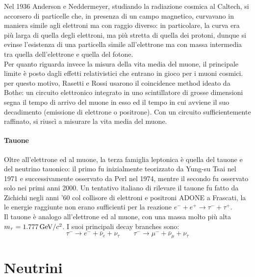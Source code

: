 Nel 1936 Anderson e Neddermeyer, studiando la radiazione cosmica al Caltech, si accorsero di particelle che, in presenza di un campo magnetico, curvavano in maniera simile agli elettroni ma con raggio diverso: in particolare, la curva era più larga di quella degli elettroni, ma più stretta di quella dei protoni, dunque si evinse l'esistenza di una particella simile all'elettrone ma con massa intermedia tra quella dell'elettrone e quella del fotone.\\
Per quanto riguarda invece la misura della vita media del muone, il principale limite è posto dagli effetti relativistici che entrano in gioco per i muoni cosmici. per questo motivo, Rasetti e Rossi usarono il coincidence method ideato da Bothe: un circuito elettronico integrato in uno scintillatore di grosse dimensioni segna il tempo di arrivo del muone in esso ed il tempo in cui avviene il suo decadimento (emissione di elettrone o positrone). Con un circuito sufficientemente raffinato, si riuscì a misurare la vita media del muone.

\paragraph{Tauone}

Oltre all'elettrone ed al muone, la terza famiglia leptonica è quella del tauone e del neutrino tauonico: il primo fu inizialmente teorizzato da Yung-su Tsai nel 1971 e successivamente osservato da Perl nel 1974, mentre il secondo fu osservato solo nei primi anni 2000. Un tentativo italiano di rilevare il tauone fu fatto da Zichichi negli anni '60 col collisore di elettroni e positroni ADONE a Frascati, la le energie raggiunte non erano sufficienti per la reazione $ e^- + e^+ \rightarrow \tau^- + \tau^+ $.\\
Il tauone è analogo all'elettrone ed al muone, con una massa molto più alta $ m_{\tau} = 1.777\,\mathrm{GeV}/c^2 $. I suoi principali decay branches sono:
\begin{equation*}
	\tau^- \rightarrow e^- + \bar{\nu}_e + \nu_{\tau}
	\qquad
	\tau^- \rightarrow \mu^- + \bar{\nu}_{\mu} + \nu_{\tau}
\end{equation*}

\section{Neutrini}


